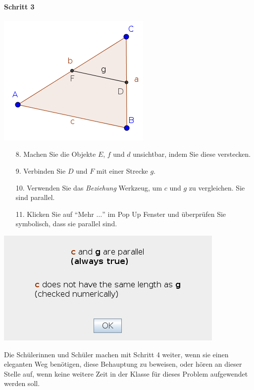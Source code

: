 \documentclass{article}
\begin{document}
\paragraph{Schritt 3}
\begin{center}
\includegraphics[scale=0.5]{classroom3}
\end{center}
\begin{enumerate}
    \item[8.] Machen Sie die Objekte $E$, $f$ und $d$ unsichtbar, indem Sie diese verstecken.
    \item[9.] Verbinden Sie $D$ und $F$ mit einer Strecke $g$.
    \item[10.] Verwenden Sie das  \textit{Beziehung} Werkzeug, um $c$ und $g$ zu vergleichen. Sie sind parallel.
    \item[11.] Klicken Sie auf ``Mehr $\ldots$'' im Pop Up Fenster und überprüfen Sie symbolisch, dass sie parallel sind.
\end{enumerate}
\begin{center}
\includegraphics[scale=0.5]{classroom3-Relation}
\end{center}
Die Schülerinnen und  Schüler machen mit Schritt 4 weiter, wenn sie einen eleganten Weg benötigen, diese Behauptung zu beweisen, oder hören an dieser Stelle auf, wenn keine weitere Zeit in der Klasse für dieses Problem aufgewendet werden soll.
\end{document}
